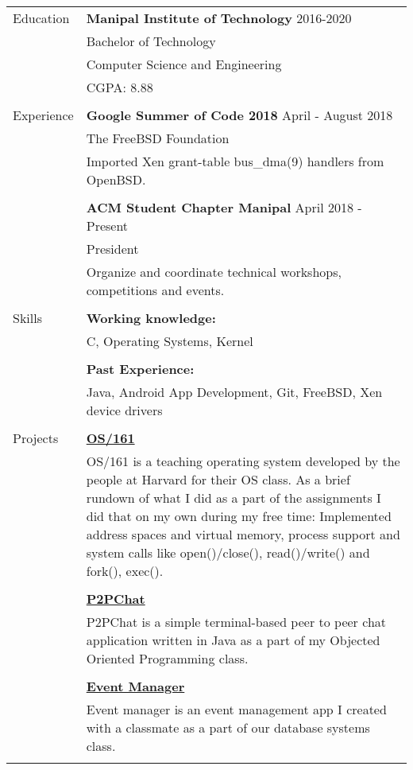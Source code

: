 \documentclass[letterpaper,11pt,oneside]{article}
\begin{document}
\noindent \begin{tabular}{@{} l l}
 \Large{Education} & \textbf{Manipal Institute of Technology} \hfill 2016-2020  \\
     & Bachelor of Technology \\
     & Computer Science and Engineering \\
     &  CGPA: 8.88\\
     & \\
 \Large{Experience}    & \textbf{Google Summer of Code 2018} \hfill April - August 2018 \\
    & The FreeBSD Foundation \\
    & Imported Xen grant-table bus\_dma(9) handlers from OpenBSD. \\
    & \\
    & \textbf{ACM Student Chapter Manipal} \hfill April 2018 -  Present \\
    & President \\
    & Organize and coordinate technical workshops, competitions and events. \\
    & \\
 \Large{Skills} & \textbf{Working knowledge:} \\
    & C, Operating Systems, Kernel \\
    & \\
    & \textbf{Past Experience:} \\
    & Java, Android App Development, Git, FreeBSD, Xen device drivers \\
    & \\
 \Large{Projects} & \textbf{\href{https://github.com/prati0100/OS161}{OS/161}} \vspace{1ex} \\
    & \parbox{5.0in}{OS/161 is a teaching operating system developed by the people at Harvard for their OS class. As a brief rundown of what I did as a part of the assignments I did that on my own during my free time: Implemented address spaces and virtual memory, process support and system calls like open()/close(), read()/write() and fork(), exec().} \\
    & \\
    & \textbf{\href{https://github.com/prati0100/P2PChat}{P2PChat}} \vspace{1ex} \\
    & \parbox{5.0in}{P2PChat is a simple terminal-based peer to peer chat application written in Java as a part of my Objected Oriented Programming class.} \\
    & \\
    & \textbf{\href{https://github.com/prati0100/EventManager}{Event Manager}} \vspace{1ex} \\
    & \parbox{5.0in}{Event manager is an event management app I created with a classmate as a part of our database systems class.} \\
    & \\

\end{tabular}
\end{document}
